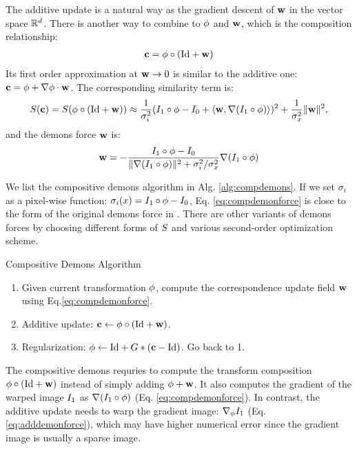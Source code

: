 \documentclass[letterpaper,12pt]{article}
\begin{document}
The additive update is a natural way as the gradient descent of $\mathbf{w}$ in the vector space $\mathbb{R}^d$. There is another way to combine to $\phi$ and $\mathbf{w}$, which is the composition relationship:
\begin{align}
\mathbf{c} = \phi \circ \left( \text{Id} + \mathbf{w} \right)
\label{eq:demoncomp}
\end{align}
Its first order approximation at $\mathbf{w} \to 0$ is similar to the additive one: $\mathbf{c} = \phi + \nabla\phi\cdot\mathbf{w}$. The corresponding similarity term is:
\begin{align}
S(\mathbf{c}) = S(\phi \circ (\text{Id} + \mathbf{w}) ) \approx
\frac{1}{\sigma_i^2} ( I_1 \circ \phi - I_0 + \langle \mathbf{w}, \nabla (I_1 \circ \phi ) \rangle )^2 
+ \frac{1}{\sigma_x^2} \| \mathbf{w} \|^2,
\end{align}
and the demons force $\mathbf{w}$ is:
\begin{align}
\mathbf{w} = -\frac{I_1 \circ \phi - I_0 }
           {\|\nabla (I_1 \circ \phi )\|^2 + {\sigma_i^2}/{\sigma_x^2}}
           \nabla (I_1 \circ \phi )
\label{eq:compdemonforce}           
\end{align}

We list the compositive demons algorithm in Alg. \ref{alg:compdemons}. 
If we set $\sigma_i$ as a pixel-wise function: $\sigma_i(x) = I_1 \circ \phi - I_0 $, Eq. \ref{eq:compdemonforce} is close to the form of the original demons force in \cite{Thirion98}. There are other variants of demons forces by choosing different forms of $S$ and various second-order optimization scheme. 

\begin{algorithm}
\caption{Compositive Demons Algorithm}
\label{alg:compdemons}
\begin{enumerate}
\item{Given current transformation $\phi$, compute the correspondence update field $\mathbf{w}$ using Eq.\ref{eq:compdemonforce}. 
}
\item{Additive update: $\mathbf{c} \leftarrow \phi \circ \left( \text{Id} + \mathbf{w} \right)$.
}
\item{Regularization: $\phi \leftarrow \text{Id} + {G} \ast (\mathbf{c} - \text{Id})$. Go back to 1.
}
\end{enumerate}
\end{algorithm}

The compositive demons requries to compute the transform composition $\phi \circ \left( \text{Id} + \mathbf{w} \right)$ instead of simply adding $\phi + \mathbf{w}$. It also computes the gradient of the warped image $I_1$ as $\nabla (I_1 \circ \phi)$ (Eq. \ref{eq:compdemonforce}). In contrast, the additive update needs to warp the gradient image: $\nabla_{\phi}I_1$ (Eq. \ref{eq:adddemonforce}), which may have higher numerical error since the gradient image is usually a sparse image.
\end{document}

